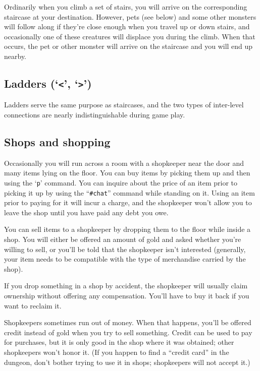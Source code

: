 Ordinarily when you climb a set of stairs, you will arrive on the
corresponding staircase at your destination.  However, pets (see below)
and some other monsters will follow along if they're close enough when
you travel up or down stairs, and occasionally one of these creatures
will displace you during the climb.  When that occurs, the pet or other
monster will arrive on the staircase and you will end up nearby.

\subsection*{Ladders (`{\tt <}', `{\tt >}')}

Ladders serve the same purpose as staircases, and the two types of
inter-level connections are nearly indistinguishable during game play.

\subsection*{Shops and shopping}

Occasionally you will run across a room with a shopkeeper near the door
and many items lying on the floor.  You can buy items by picking them
up and then using the `{\tt p}' command.  You can inquire about the price
of an item prior to picking it up by using the ``{\tt \#chat}'' command
while standing on it.  Using an item prior to paying for it will incur a
charge, and the shopkeeper won't allow you to leave the shop until you
have paid any debt you owe.

You can sell items to a shopkeeper by dropping them to the floor while
inside a shop.  You will either be offered an amount of gold and asked
whether you're willing to sell, or you'll be told that the shopkeeper
isn't interested (generally, your item needs to be compatible with the
type of merchandise carried by the shop).

If you drop something in a shop by accident, the shopkeeper will usually
claim ownership without offering any compensation.  You'll have to buy
it back if you want to reclaim it.

Shopkeepers sometimes run out of money.  When that happens, you'll be
offered credit instead of gold when you try to sell something.  Credit
can be used to pay for purchases, but it is only good in the shop where
it was obtained; other shopkeepers won't honor it.  (If you happen to
find a ``credit card'' in the dungeon, don't bother trying to use it in
shops; shopkeepers will not accept it.)

